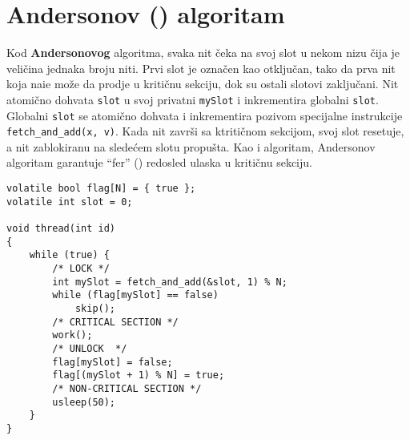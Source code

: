 \clearpage
\section{Andersonov () algoritam}
Kod \textbf{Andersonovog } algoritma, svaka nit \v{c}eka na svoj slot u nekom nizu \v{c}ija je veli\v{c}ina jednaka broju niti. Prvi slot je ozna\v{c}en kao otklju\v{c}an, tako da prva nit koja nai\dj{}e mo\v{z}e da prodje u kriti\v{c}nu sekciju, dok su ostali slotovi zaklju\v{c}ani. Nit atomi\v{c}no dohvata \texttt{slot} u svoj privatni \texttt{mySlot} i inkrementira globalni \texttt{slot}. Globalni \texttt{slot} se atomi\v{c}no dohvata i inkrementira pozivom specijalne instrukcije \texttt{fetch\_and\_add(x, v)}. Kada nit zavr\v{s}i sa ktriti\v{c}nom sekcijom, svoj slot resetuje, a nit zablokiranu na slede\'{c}em slotu propu\v{s}ta. Kao i  algoritam, Andersonov algoritam garantuje ``fer'' () redosled ulaska u kriti\v{c}nu sekciju.
\begin{lstlisting}
volatile bool flag[N] = { true };
volatile int slot = 0;

void thread(int id)
{
    while (true) {
        /* LOCK */
		int mySlot = fetch_and_add(&slot, 1) % N;
        while (flag[mySlot] == false)
            skip();
        /* CRITICAL SECTION */
        work();
        /* UNLOCK  */
        flag[mySlot] = false;
        flag[(mySlot + 1) % N] = true;
        /* NON-CRITICAL SECTION */
        usleep(50);
    }
}
\end{lstlisting}